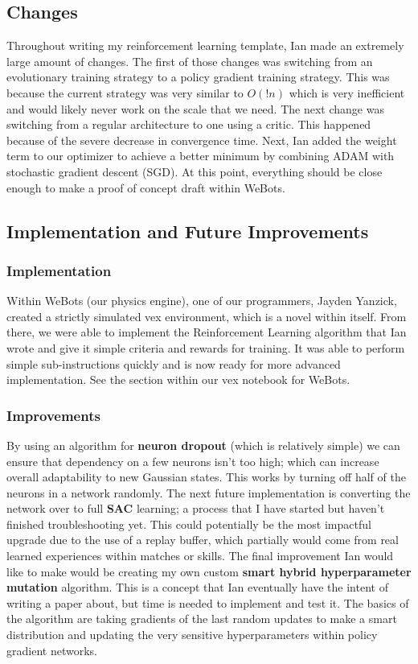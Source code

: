 \subsection*{Changes}
Throughout writing my reinforcement learning template, Ian made an extremely large amount of changes. The first of those changes was switching from an evolutionary training strategy to a policy gradient training strategy. This was because the current strategy was very similar to $O(!n)$ which is very inefficient and would likely never work on the scale that we need. The next change was switching from a regular architecture to one using a critic. This happened because of the severe decrease in convergence time. Next, Ian added the weight term to our optimizer to achieve a better minimum by combining ADAM with stochastic gradient descent (SGD). At this point, everything should be close enough to make a proof of concept draft within WeBots.

\subsection*{Implementation and Future Improvements}

\subsubsection*{Implementation}
Within WeBots (our physics engine), one of our programmers, Jayden Yanzick, created a strictly simulated vex environment, which is a novel within itself. From there, we were able to implement the Reinforcement Learning algorithm that Ian wrote and give it simple criteria and rewards for training. It was able to perform simple sub-instructions quickly and is now ready for more advanced implementation. See the section within our vex notebook for WeBots.

\subsubsection*{Improvements}
By using an algorithm for \textbf{neuron dropout} (which is relatively simple) we can ensure that dependency on a few neurons isn't too high; which can increase overall adaptability to new Gaussian states. This works by turning off half of the neurons in a network randomly. The next future implementation is converting the network over to full \textbf{SAC} learning; a process that I have started but haven't finished troubleshooting yet. This could potentially be the most impactful upgrade due to the use of a replay buffer, which partially would come from real learned experiences within matches or skills. The final improvement Ian would like to make would be creating my own custom \textbf{smart hybrid hyperparameter mutation} algorithm. This is a concept that Ian eventually have the intent of writing a paper about, but time is needed to implement and test it. The basics of the algorithm are taking gradients of the last random updates to make a smart distribution and updating the very sensitive hyperparameters within policy gradient networks.
